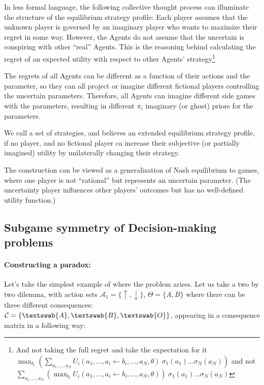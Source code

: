 \documentclass{article}
\begin{document}
In less formal language, the following collective thought process can illuminate the structure of the equilibrium strategy profile:
Each player assumes that the unknown player is governed by an imaginary player who wants to maximize their regret in some way. However, the Agents do not assume that the uncertain is conspiring with other “real” Agents. This is the reasoning behind calculating the regret of an expected utility with respect to other Agents' strategy\footnote{And not taking the full regret and take the expectation for it $\max_{b_i} 
\left (
\sum_{a_1,\dots,a_N} U_i(a_1,\dots,a_i \leftarrow b_i,\dots,a_N,\theta) \ 
\sigma_1(a_1) \dots \sigma_N(a_N)
\right )$
and not
$ \sum_{a_1,\dots,a_N} \left ( \max_{b_i} U_i(a_1,\dots,a_i \leftarrow b_i,\dots,a_N,\theta) \right ) \ 
\sigma_1(a_1) \dots \sigma_N(a_N)
$
}

The regrets of all Agents can be different as a function of their actions and the parameter, so they can all project or imagine different fictional players controlling the uncertain parameters.
Therefore, all Agents can imagine different side games with the parameters, resulting in different $\pi_i$ imaginary (or ghost) priors for the parameters.

We call a set of strategies, and believes an extended equilibrium strategy profile, if no player, and no fictional player ca increase their subjective (or partially imagined) utility by unilaterally changing their strategy.

The construction can be viewed as a generalization of Nash equilibrium to games, where one player is not “rational” but represents an uncertain parameter. (The uncertainty player influences other players' outcomes but has no well-defined utility function.)

\subsection*{Subgame symmetry of Decision-making problems}

\paragraph{Constructing a paradox:}

Let's take the simplest example of where the problem arises.
Let us take a two by two dilemma, with action sets $\mathcal{A}_1 = \{\uparrow,\downarrow\}$, $\Theta=\{A,B\}$ where there can be three different consequences: $\mathcal{C}=\{\textswab{A},\textswab{B},\textswab{O}\}$, appearing in a consequence matrix in a following way:
\end{document}
